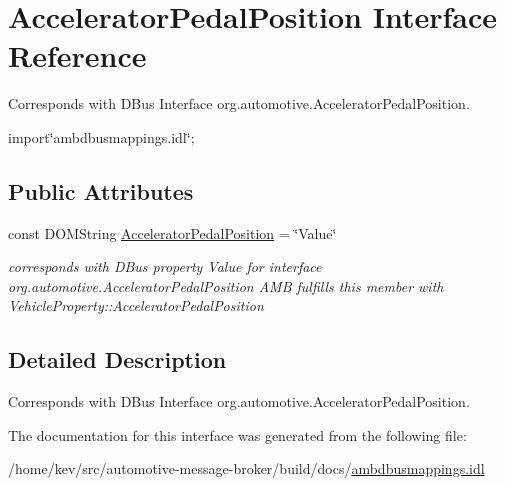 \hypertarget{interfaceAcceleratorPedalPosition}{\section{Accelerator\+Pedal\+Position Interface Reference}
\label{interfaceAcceleratorPedalPosition}
}


Corresponds with D\+Bus Interface org.\+automotive.\+Accelerator\+Pedal\+Position.  




{\ttfamily import\char`\"{}ambdbusmappings.\+idl\char`\"{};}

\subsection*{Public Attributes}
\begin{DoxyCompactItemize}
\item 
\hypertarget{interfaceAcceleratorPedalPosition_afb7c6ff4c0f1eb7293376f3eba1d0d0d}{const D\+O\+M\+String \hyperlink{interfaceAcceleratorPedalPosition_afb7c6ff4c0f1eb7293376f3eba1d0d0d}{Accelerator\+Pedal\+Position} = \char`\"{}Value\char`\"{}}\label{interfaceAcceleratorPedalPosition_afb7c6ff4c0f1eb7293376f3eba1d0d0d}

\begin{DoxyCompactList}\small\item\em corresponds with D\+Bus property Value for interface org.\+automotive.\+Accelerator\+Pedal\+Position A\+M\+B fulfills this member with Vehicle\+Property\+::\+Accelerator\+Pedal\+Position \end{DoxyCompactList}\end{DoxyCompactItemize}


\subsection{Detailed Description}
Corresponds with D\+Bus Interface org.\+automotive.\+Accelerator\+Pedal\+Position. 

The documentation for this interface was generated from the following file\+:\begin{DoxyCompactItemize}
\item 
/home/kev/src/automotive-\/message-\/broker/build/docs/\hyperlink{ambdbusmappings_8idl}{ambdbusmappings.\+idl}\end{DoxyCompactItemize}
